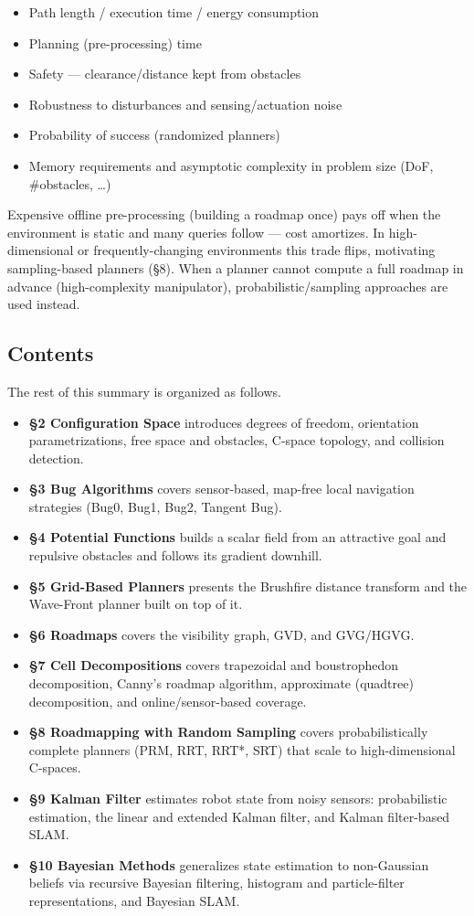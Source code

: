 \begin{itemize}
\item Path length / execution time / energy consumption
\item Planning (pre-processing) time
\item Safety --- clearance/distance kept from obstacles
\item Robustness to disturbances and sensing/actuation noise
\item Probability of success (randomized planners)
\item Memory requirements and asymptotic complexity in problem size (DoF, \#obstacles, \dots)
\end{itemize}
\begin{notebox}
Expensive offline pre-processing (building a roadmap once) pays off when the environment is static and many queries follow --- cost amortizes. In high-dimensional or frequently-changing environments this trade flips, motivating sampling-based planners (\S8). When a planner cannot compute a full roadmap in advance (high-complexity manipulator), probabilistic/sampling approaches are used instead.
\end{notebox}

\subsection{Contents}
The rest of this summary is organized as follows.
\begin{itemize}
\item \textbf{\S2 Configuration Space} introduces degrees of freedom, orientation parametrizations, free space and obstacles, C-space topology, and collision detection.
\item \textbf{\S3 Bug Algorithms} covers sensor-based, map-free local navigation strategies (Bug0, Bug1, Bug2, Tangent Bug).
\item \textbf{\S4 Potential Functions} builds a scalar field from an attractive goal and repulsive obstacles and follows its gradient downhill.
\item \textbf{\S5 Grid-Based Planners} presents the Brushfire distance transform and the Wave-Front planner built on top of it.
\item \textbf{\S6 Roadmaps} covers the visibility graph, GVD, and GVG/HGVG.
\item \textbf{\S7 Cell Decompositions} covers trapezoidal and boustrophedon decomposition, Canny's roadmap algorithm, approximate (quadtree) decomposition, and online/sensor-based coverage.
\item \textbf{\S8 Roadmapping with Random Sampling} covers probabilistically complete planners (PRM, RRT, RRT*, SRT) that scale to high-dimensional C-spaces.
\item \textbf{\S9 Kalman Filter} estimates robot state from noisy sensors: probabilistic estimation, the linear and extended Kalman filter, and Kalman filter-based SLAM.
\item \textbf{\S10 Bayesian Methods} generalizes state estimation to non-Gaussian beliefs via recursive Bayesian filtering, histogram and particle-filter representations, and Bayesian SLAM.
\end{itemize}

